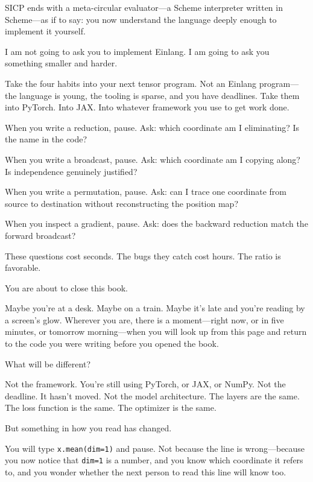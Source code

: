 \documentclass[11pt,titlepage]{article}
\begin{document}
\vspace{2em}

SICP ends with a meta-circular evaluator---a Scheme interpreter written
in Scheme---as if to say: you now understand the language deeply enough
to implement it yourself.

I am not going to ask you to implement Einlang. I am going to ask you
something smaller and harder.

Take the four habits into your next tensor program. Not an Einlang
program---the language is young, the tooling is sparse, and you have
deadlines. Take them into PyTorch. Into JAX. Into whatever framework you
use to get work done.

When you write a reduction, pause. Ask: which coordinate am I
eliminating? Is the name in the code?

When you write a broadcast, pause. Ask: which coordinate am I copying
along? Is independence genuinely justified?

When you write a permutation, pause. Ask: can I trace one coordinate
from source to destination without reconstructing the position map?

When you inspect a gradient, pause. Ask: does the backward reduction
match the forward broadcast?

These questions cost seconds. The bugs they catch cost hours. The ratio
is favorable.

\vspace{2em}

You are about to close this book.

Maybe you're at a desk. Maybe on a train. Maybe it's late and you're
reading by a screen's glow. Wherever you are, there is a moment---right
now, or in five minutes, or tomorrow morning---when you will look up
from this page and return to the code you were writing before you opened
the book.

What will be different?

Not the framework. You're still using PyTorch, or JAX, or NumPy. Not the
deadline. It hasn't moved. Not the model architecture. The layers are
the same. The loss function is the same. The optimizer is the same.

But something in how you read has changed.

You will type \texttt{x.mean(dim=1)} and pause. Not because the line is
wrong---because you now notice that \texttt{dim=1} is a number, and you
know which coordinate it refers to, and you wonder whether the next
person to read this line will know too.
\end{document}
